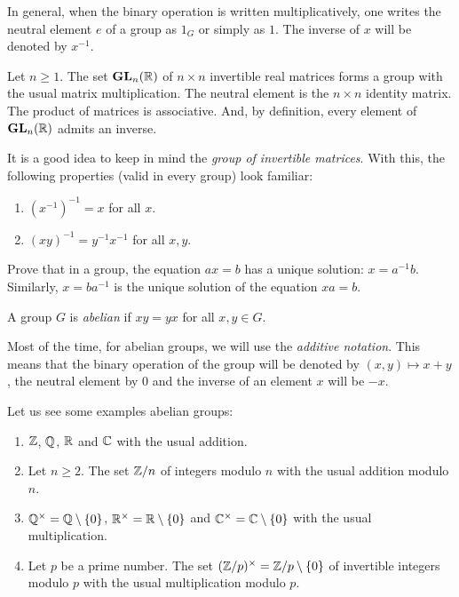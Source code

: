 In general, when the binary operation is written multiplicatively, one
writes the neutral element $e$ of a group as $1_G$ or simply as $1$. The inverse of $x$ will be 
denoted by $x^{-1}$. 

\begin{example}
    Let $n\geq1$. The set $\mathbf{GL}_n(\mathbb{R})$ of $n\times n$ invertible real 
matrices forms a
    group with the usual matrix multiplication. The neutral element is the $n\times n$ 
    identity matrix. The product 
    of matrices is associative. And, by definition, every element of $\mathbf{GL}_n(\mathbb{R})$ admits an inverse. 
\end{example}

It is a good idea to keep in mind the \emph{group of invertible matrices}. 
With this, the following properties (valid in every group) look familiar:
\begin{enumerate}
    \item $(x^{-1})^{-1}=x$ for all $x$.
    \item $(xy)^{-1}=y^{-1}x^{-1}$ for all $x,y$. 
\end{enumerate}

\begin{exercise}
\label{xca:ax=b}
    Prove that in a group, the equation $ax=b$ has 
    a unique solution: $x=a^{-1}b$. Similarly, 
    $x=ba^{-1}$ is the unique solution of the equation
    $xa=b$. 
\end{exercise}

\begin{definition}
    A group $G$ is \emph{abelian} if $xy=yx$ for all $x,y\in G$. 
\end{definition}

Most of the time, for abelian groups, we will use 
the \emph{additive notation}. This means that the binary operation
of the group will be denoted by $(x,y)\mapsto x+y$, the neutral
element by $0$ and 
the inverse of an element $x$ will be $-x$. 

\begin{example}
\label{exa:abelian_groups}
    Let us see some examples 
    abelian groups: 
    \begin{enumerate}
        \item $\mathbb{Z}$, $\mathbb{Q}$, $\mathbb{R}$ and $\mathbb{C}$ with the usual addition. 
        \item Let $n\geq2$. The set $\mathbb{Z}/n$ of integers modulo $n$ with the usual addition modulo $n$.
        \item $\mathbb{Q}^\times=\mathbb{Q}\setminus\{0\}$, $\mathbb{R}^\times=\mathbb{R}\setminus\{0\}$ and $\mathbb{C}^\times=\mathbb{C}\setminus\{0\}$ 
        with the usual multiplication.
        \item Let $p$ be a prime number. The set $(\mathbb{Z}/p)^{\times}=\mathbb{Z}/p\setminus\{0\}$ of invertible integers modulo $p$ 
            with the usual multiplication modulo $p$. 
    \end{enumerate}
\end{example}

